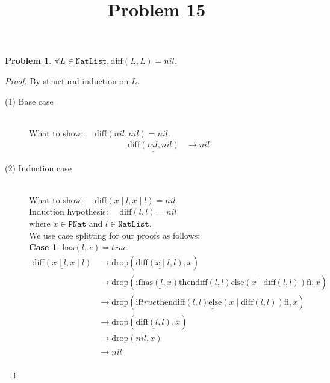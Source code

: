 \documentclass[12pt, a4paper]{article}
\title{Problem 15}
\date{\vspace{-5ex}}
\newtheorem{problem}{Problem}
\newcommand{\rel}[1]{\mathrel{#1}}
\newcommand{\rmx}[1]{\mathrm{#1}}
\newcommand{\larrow}{\longrightarrow}
\newcommand{\under}{\underline}
\begin{document}
\maketitle

\begin{problem}
$\forall L \in \mathtt{NatList}, \rmx{diff}(L, L) = nil$.
\end{problem}
\begin{proof}
By structural induction on $L$.
\begin{description}
\item[(1) Base case]~\\
\noindent
What to show: $\quad \rmx{diff}(nil, nil) = nil$.
\begin{align*}
\under{\rmx{diff}(nil, nil)}
	&\larrow nil \tag{by diff1}
\end{align*}

\item[(2) Induction case]~\\
What to show: $\quad \rmx{diff}(x \mid l, x \mid l) = nil$ \\
Induction hypothesis: $\quad \rmx{diff}(l, l) = nil$  \\
where $x \in \mathtt{PNat}$ and $l \in \mathtt{NatList}$.\\
We use case splitting for our proofs as follows: \\
\textbf{Case 1}: $\rmx{has}(l, x) = true$
\begin{align*}
\under{\rmx{diff}(x \mid l, x \mid l)}
	&\larrow \rmx{drop}(\under{\rmx{diff}(x \mid l, l)}, x) \tag{by Problem 14} \\
	&\larrow \rmx{drop}(\rel{\rmx{if}} \under{\rmx{has}(l, x)} \rel{\rmx{then}} \rmx{diff}(l, l) \rel{\rmx{else}} (x \mid \rmx{diff}(l, l)) \rel{\rmx{fi}}, x) \tag{by diff2} \\
	&\larrow \rmx{drop}(\under{\rel{\rmx{if}} true \rel{\rmx{then}} \rmx{diff}(l, l) \rel{\rmx{else}} (x \mid \rmx{diff}(l, l)) \rel{\rmx{fi}}}, x) \tag{by case splitting} \\
	&\larrow \rmx{drop}(\under{\rmx{diff}(l, l)}, x) \tag{by if1} \\
	&\larrow \under{\rmx{drop}(nil, x)} \tag{by IH} \\
	&\larrow nil \tag{by drop1} \\
\end{align*}


\end{description}
\end{proof}
\end{document}
